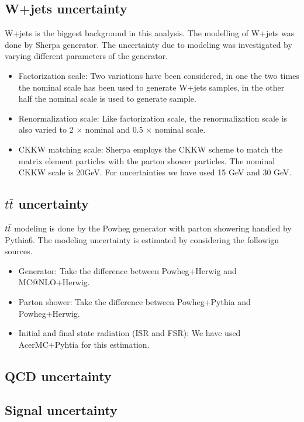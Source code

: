 \subsection{W+jets uncertainty}
W+jets is the biggest background in this analysis. The modelling of W+jets was done by Sherpa generator. The uncertainty due to modeling was investigated by varying different parameters of the generator.
\begin{itemize}
\item Factorization scale:	Two variations have been considered, in one the two times the nominal scale has been used to generate W+jets samples, in the other half the nominal scale is used to generate sample.
\item Renormalization scale: Like factorization scale, the renormalization scale is also varied to 2 $\times$ nominal and 0.5 $\times$ nominal scale.
\item CKKW matching scale: Sherpa employs the CKKW scheme to match the matrix element particles with the parton shower particles. The nominal CKKW scale is 20GeV. For uncertainties we have used 15 GeV and 30 GeV.
\end{itemize}
\subsection{ $t\bar{t}$ uncertainty}
$t\bar{t}$ modeling is done by the Powheg generator with parton showering handled by Pythia6. The modeling uncertainty is estimated by considering the followign sources.
\begin{itemize}
\item Generator: Take the difference between Powheg+Herwig and MC@NLO+Herwig.
\item Parton shower: Take the difference between Powheg+Pythia and Powheg+Herwig.
\item Initial and final state radiation (ISR and FSR): We have used AcerMC+Pyhtia for this estimation. %
 
\end{itemize}
\subsection{QCD uncertainty}
\subsection{Signal uncertainty}
